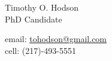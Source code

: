 \begin{cvlist}{}

\item
\begin{minipage}[t]{2.2in}
        Timothy O. Hodson\\ 
        PhD Candidate\\
\end{minipage} \hfill
\begin{minipage}[t]{3in}
        email: \href{mailto:tohodson@gmail.com}{tohodson@gmail.com}\\
        cell: (217)-493-5551
\end{minipage}

\end{cvlist}
